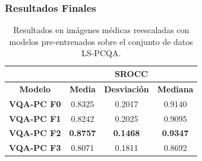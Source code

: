 \begin{frame}
  \frametitle{Resultados Finales}
\begin{table}[H]
  \small 
  \centering
\begin{tabular}{|c|c|c|c|}
\hline
\rowcolor[HTML]{FFC702}
                       & \multicolumn{3}{c|}{\textbf{SROCC}}                                                                                                          \\ \hline
\rowcolor[HTML]{FFC702}
\textbf{Modelo}    & \textbf{Media} & \textbf{Desviación} & \textbf{Mediana} \\ \hline
\textbf{VQA-PC F0} & 0.8325           & 0.2017              & 0.9140           \\ \hline
\textbf{VQA-PC F1} & 0.8242           & 0.2025              & 0.9095           \\ \hline
\textbf{VQA-PC F2} & \textbf{0.8757}  & \textbf{0.1468}     & \textbf{0.9347}  \\ \hline
\textbf{VQA-PC F3} & 0.8071           & 0.1811              & 0.8692           \\ \hline
\end{tabular}
\caption[Resultados en imágenes médicas reescaladas entrenando en LS-PCQA.]{
  Resultados en imágenes médicas reescaladas con modelos pre-entrenados 
  sobre el conjunto de datos LS-PCQA\footnotemark[10]. 
}\label{tab:LS-PCQA-FN}
\end{table}
\end{frame}


